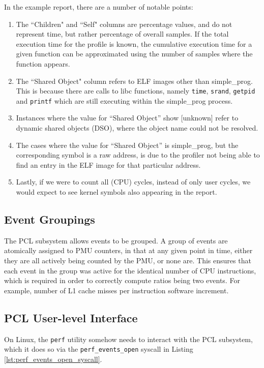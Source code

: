 In the example report, there are a number of notable points:
\ssp
\begin{enumerate}
    \item The ``Children" and ``Self" columns are percentage values, and do not represent time, but rather percentage of overall samples. If the total execution time for the profile is known, the cumulative execution time for a given function can be approximated using the number of samples where the function appears. 
    \item The ``Shared Object" column refers to ELF images other than simple\_prog. This is because there are calls to libc functions, namely \texttt{time}, \texttt{srand}, \texttt{getpid} and \texttt{printf} which are still executing within the simple\_prog process.
    \item Instances where the value for ``Shared Object'' show [unknown] refer to dynamic shared objects (DSO), where the object name could not be resolved.
    \item The cases where the value for ``Shared Object'' is simple\_prog, but the corresponding symbol is a raw address, is due to the profiler not being able to find an entry in the ELF image for that particular address.
    \item Lastly, if we were to count all (CPU) cycles, instead of only user cycles, we would expect to see kernel symbols also appearing in the report.
\end{enumerate}
\dsp

\subsection{Event Groupings}\label{sect:event_groupings}

The PCL subsystem allows events to be grouped. A group of events are atomically assigned to PMU counters, in that at any given point in time, either they are all actively being counted by the PMU, or none are. This ensures that each event in the group was active for the identical number of CPU instructions, which is required in order to correctly compute ratios being two events. For example, number of L1 cache misses per instruction software increment.

\subsection{PCL User-level Interface}\label{sect:perf_event_open}

On Linux, the \texttt{perf} utility somehow needs to interact with the PCL subsystem, which it does so via the \texttt{perf\_events\_open} syscall in Listing \ref{lst:perf_events_open_syscall}.

